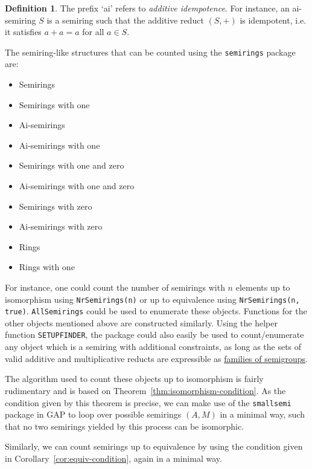 \documentclass{article}
\theoremstyle{definition}
\newtheorem{defn}{Definition}[section]
\theoremstyle{plain}
\begin{document}
\begin{defn}
  The prefix `ai' refers to \emph{additive idempotence}. For
  instance, an ai-semiring \(S\) is a semiring such that the additive
  reduct $(S, +)$ is idempotent, i.e. it satisfies \(a + a = a\) for
  all \(a\in S\).
\end{defn}

The semiring-like structures that can be counted using the
\texttt{semirings} package are:

\begin{multicols}{2}
  \begin{itemize}
    \item Semirings
    \item Semirings with one
    \item Ai-semirings
    \item Ai-semirings with one
    \item Semirings with one and zero
    \item Ai-semirings with one and zero
    \item Semirings with zero
    \item Ai-semirings with zero
    \item Rings
    \item Rings with one
  \end{itemize}
\end{multicols}

For instance, one could count the number of semirings with \(n\)
elements up to isomorphism using \texttt{NrSemirings(n)} or up to
equivalence using \texttt{NrSemirings(n, true)}.
\texttt{AllSemirings} could be used to enumerate these objects.
Functions for the other objects mentioned above are constructed
similarly. Using the helper function \texttt{SETUPFINDER}, the
package could also easily be used to count/enumerate any object which
is a semiring with additional constraints, as long as the sets of
valid additive and multiplicative reducts are expressible as
\href{https://gap-packages.github.io/smallsemi/doc/chap4_mj.html#X82F9C36C86006857}{families
of semigroups}.

The algorithm used to count these objects up to isomorphism is fairly
rudimentary and is based on Theorem~\ref{thm:isomorphism-condition}.
As the condition given by this theorem is precise, we can make use of
the \texttt{smallsemi} package in GAP to loop over possible semirings
\((A, M)\) in a minimal way, such that no two semirings yielded by
this process can be isomorphic.

Similarly, we can count semirings up to equivalence by using the
condition given in Corollary~\ref{cor:equiv-condition}, again in a minimal way.
\end{document}
